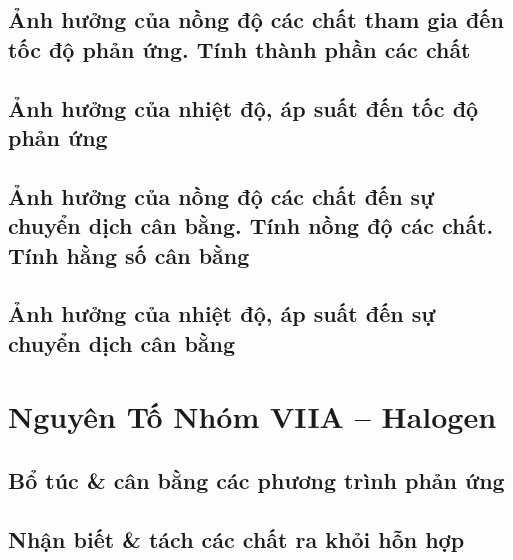 \documentclass{article}
\numberwithin{equation}{section}
\begin{document}
\subsection{Ảnh hưởng của nồng độ các chất tham gia đến tốc độ phản ứng. Tính thành phần các chất}


\subsection{Ảnh hưởng của nhiệt độ, áp suất đến tốc độ phản ứng}


\subsection{Ảnh hưởng của nồng độ các chất đến sự chuyển dịch cân bằng. Tính nồng độ các chất. Tính hằng số cân bằng}


\subsection{Ảnh hưởng của nhiệt độ, áp suất đến sự chuyển dịch cân bằng}


\section{Nguyên Tố Nhóm VIIA -- Halogen}

\subsection{Bổ túc \& cân bằng các phương trình phản ứng}


\subsection{Nhận biết \& tách các chất ra khỏi hỗn hợp}

\end{document}
